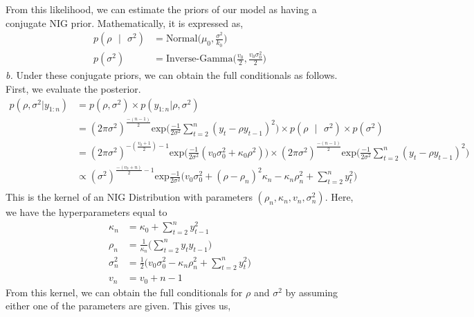 \documentclass[11pt]{article}
\begin{document}
From this likelihood, we can estimate the priors of our model as having a conjugate NIG prior. Mathematically, it is expressed as,
\begin{equation}
  \nonumber
  \begin{aligned}
    p(\rho \text{ }|\text{ } \sigma^2) & = \text{Normal}\bigg(\mu_{0}, \frac{\sigma^2}{k_{0}}\bigg)\\
    p(\sigma^2) & = \text{Inverse-Gamma}\bigg(\frac{v_{0}}{2}, \frac{v_{0}\sigma_{0}^2}{2}\bigg)
  \end{aligned}
\end{equation}
\emph{b.} Under these conjugate priors, we can obtain the full conditionals as follows. First, we evaluate the posterior.
\begin{equation}
  \nonumber
  \begin{aligned}
    p(\rho, \sigma^2 | y_{1:n}) & = p(\rho, \sigma^2)\times p(y_{1:n}|\rho, \sigma^2)\\
    & = (2\pi\sigma^2)^{\frac{-(n-1)}{2}}\text{exp}\bigg(\frac{-1}{2\sigma^2}\sum_{t = 2}^{n}(y_{t} - \rho y_{t-1})^2\bigg) \times p(\rho \text{ }|\text{ } \sigma^2) \times p(\sigma^2)\\
    & = (2 \pi \sigma^2)^{-(\frac{v_0+1}{2})-1}\text{exp}\bigg(\frac{-1}{2\sigma^2}(v_{0}\sigma_0^2 + \kappa_{0}\rho^2)\bigg) \times (2\pi\sigma^2)^{\frac{-(n-1)}{2}}\text{exp}\bigg(\frac{-1}{2\sigma^2}\sum_{t = 2}^{n}(y_{t} - \rho y_{t-1})^2\bigg)\\
    & \propto (\sigma^2)^{\frac{-(v_0 + n)}{2}-1}\text{exp}{\frac{-1}{2\sigma^2}\bigg(v_0\sigma_0^2 + (\rho-\rho_n)^2\kappa_n - \kappa_n\rho_n^2 + \sum_{t=2}^{n}y_{t}^2\bigg)}\\
  \end{aligned}
\end{equation}
This is the kernel of an NIG Distribution with parameters $(\rho_n, \kappa_n, v_n, \sigma_n^2)$. Here, we have the hyperparameters equal to
\begin{equation}
  \nonumber
  \begin{aligned}
    \kappa_n &= \kappa_0 + \sum_{t=2}^{n}y_{t-1}^2\\
    \rho_n &= \frac{1}{\kappa_n}\bigg(\sum_{t=2}^{n}y_{t}y_{t-1}\bigg)\\
    \sigma_n^2 &= \frac{1}{2}\bigg(v_0\sigma_0^2-\kappa_n\rho_n^2 + \sum_{t=2}^{n}y_t^2\bigg)\\
    v_n & = v_0 + n - 1
  \end{aligned}
\end{equation}
From this kernel, we can obtain the full conditionals for $\rho$ and $\sigma^2$ by assuming either one of the parameters are given. This gives us,
\end{document}
